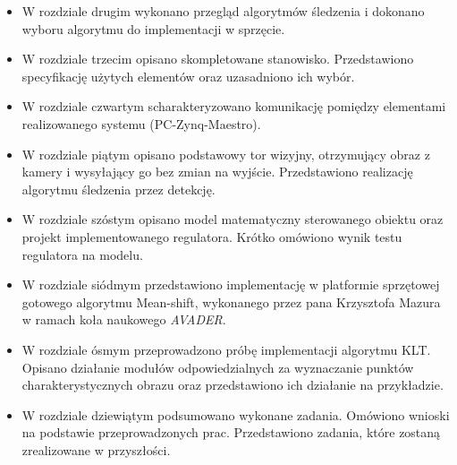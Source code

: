 \begin{itemize}
\item W rozdziale drugim wykonano przegląd algorytmów śledzenia i dokonano wyboru algorytmu do implementacji w sprzęcie.
\item W rozdziale trzecim opisano skompletowane stanowisko. Przedstawiono specyfikację użytych elementów oraz uzasadniono ich wybór.
\item W rozdziale czwartym scharakteryzowano komunikację pomiędzy elementami realizowanego systemu (PC-Zynq-Maestro).
\item W rozdziale piątym opisano podstawowy tor wizyjny, otrzymujący obraz z kamery i wysyłający go bez zmian na wyjście. Przedstawiono realizację algorytmu śledzenia przez detekcję.
\item W rozdziale szóstym opisano model matematyczny sterowanego obiektu oraz projekt implementowanego regulatora. Krótko omówiono wynik testu regulatora na modelu.
\item W rozdziale siódmym przedstawiono implementację w platformie sprzętowej gotowego algorytmu Mean-shift, wykonanego przez pana Krzysztofa Mazura w ramach koła naukowego \textit{AVADER}.
\item W rozdziale ósmym przeprowadzono próbę implementacji algorytmu KLT. Opisano działanie modułów odpowiedzialnych za wyznaczanie punktów charakterystycznych obrazu oraz przedstawiono ich działanie na przykładzie.
\item W rozdziale dziewiątym podsumowano wykonane zadania. Omówiono wnioski na podstawie przeprowadzonych prac. Przedstawiono zadania, które zostaną zrealizowane w przyszłości.
\end{itemize}